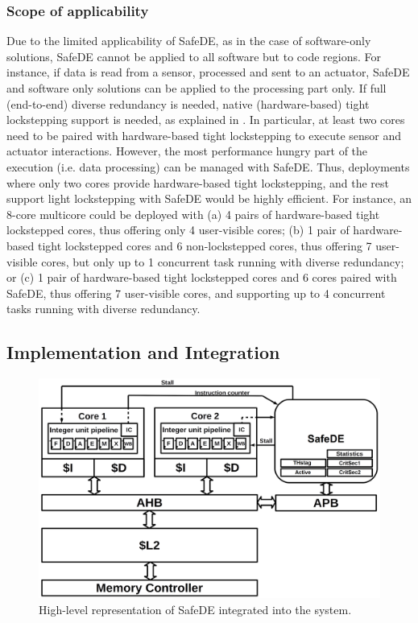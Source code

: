 \subsubsection{Scope of applicability}
Due to the limited applicability of SafeDE, as in the case of software-only solutions, SafeDE cannot be applied to all software but to code regions. For instance, if data is read from a sensor, processed and sent to an actuator, SafeDE and software only solutions can be applied to the processing part only. If full (end-to-end) diverse redundancy is needed, native (hardware-based) tight lockstepping support is needed, as explained in \cite{SergiDFT}. In particular, at least two cores need to be paired with hardware-based tight lockstepping to execute sensor and actuator interactions. However, the most performance hungry part of the execution (i.e. data processing) can be managed with SafeDE. Thus, deployments where only two cores provide hardware-based tight lockstepping, and the rest support light lockstepping with SafeDE would be highly efficient. For instance, an 8-core multicore could be deployed with (a) 4 pairs of hardware-based tight lockstepped cores, thus offering only 4 user-visible cores; (b) 1 pair of hardware-based tight lockstepped cores and 6 non-lockstepped cores, thus offering 7 user-visible cores, but only up to 1 concurrent task running with diverse redundancy; or (c) 1 pair of hardware-based tight lockstepped cores and 6 cores paired with SafeDE, thus offering 7 user-visible cores, and supporting up to 4 concurrent tasks running with diverse redundancy. 



\subsection{Implementation and Integration}
\label{sec:integ}

\begin{figure}[t!]
\centering
  \includegraphics[width=1\columnwidth]{imgs/system.png} 
  \caption{High-level representation of SafeDE integrated into the system.}
  \label{fig:system}
\end{figure}


